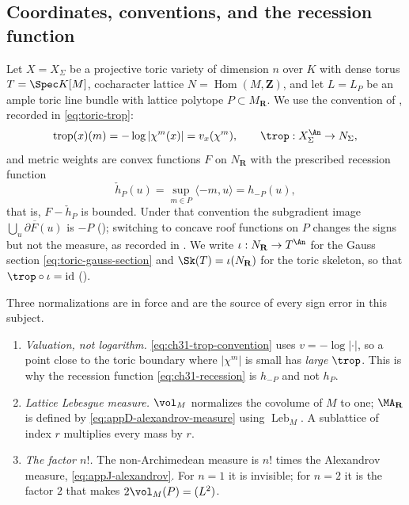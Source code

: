 \subsection{Coordinates, conventions, and the recession function}
\label{sec:ch31-toric-setup}

Let \(X=X_\Sigma\) be a projective toric variety of dimension \(n\) over
\(K\) with dense torus \(T=\Spec K[M]\), cocharacter lattice
\(N=\operatorname{Hom}(M,\mathbf Z)\), and let \(L=L_P\) be an ample toric
line bundle with lattice polytope \(P\subset M_\mathbf R\).  We use the
convention of , recorded in
\eqref{eq:toric-trop}:
\begin{equation}
\label{eq:ch31-trop-convention}
 \operatorname{trop}(x)(m)=-\log|\chi^m(x)|=v_x(\chi^m),
 \qquad
 \trop:X_\Sigma^{\An}\to N_\Sigma ,
\end{equation}
and metric weights are convex functions \(F\) on \(N_\mathbf R\) with the
prescribed recession function
\begin{equation}
\label{eq:ch31-recession}
 \check h_P(u)=\sup_{m\in P}\langle-m,u\rangle=h_{-P}(u),
\end{equation}
that is, \(F-\check h_P\) is bounded.  Under that convention the subgradient
image \(\overline{\bigcup_u\partial F(u)}\) is \(-P\)
(); switching to concave roof functions on
\(P\) changes the signs but not the measure, as recorded in
.  We write \(\iota:N_\mathbf R\to T^{\An}\) for the
Gauss section \eqref{eq:toric-gauss-section} and \(\Sk(T)=\iota(N_\mathbf R)\)
for the toric skeleton, so that \(\trop\circ\iota=\operatorname{id}\)
().

Three normalizations are in force and are the source of every sign error in
this subject.

\begin{enumerate}
\item\label{itm:ch31-toric:trop}
 \emph{Valuation, not logarithm.}  \eqref{eq:ch31-trop-convention} uses
 \(v=-\log|\cdot|\), so a point close to the toric boundary where
 \(|\chi^m|\) is small has \emph{large} \(\trop\).  This is why the
 recession function \eqref{eq:ch31-recession} is \(h_{-P}\) and not
 \(h_P\).
\item\label{itm:ch31-toric:lattice}
 \emph{Lattice Lebesgue measure.}  \(\vol_M\) normalizes the covolume of
 \(M\) to one; \(\MA_{\mathbf R}\) is defined by
 \eqref{eq:appD-alexandrov-measure} using \(\operatorname{Leb}_M\).  A
 sublattice of index \(r\) multiplies every mass by \(r\).
\item\label{itm:ch31-toric:factorial}
 \emph{The factor \(n!\).}  The non-Archimedean measure is \(n!\) times the
 Alexandrov measure, \eqref{eq:appJ-alexandrov}.  For \(n=1\) it is
 invisible; for \(n=2\) it is the factor \(2\) that makes
 \(2\vol_M(P)=(L^2)\).
\end{enumerate}


